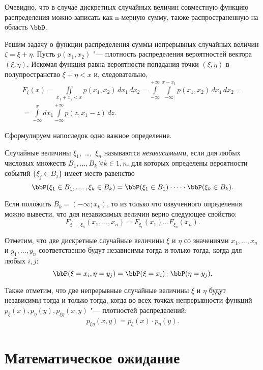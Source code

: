 Очевидно, что в случае дискретных случайных величин совместную функцию распределения можно записать как n-мерную сумму, также распространенную на область $\bbD$.


Решим задачу о функции распределения суммы непрерывных случайных величин $\zeta=\xi+\eta$. Пусть $p(x_1,x_2)$ "--- плотность распределения вероятностей вектора $(\xi,\eta)$. Искомая функция равна вероятности попадания точки $(\xi,\eta)$ в полупространство $\xi+\eta<x$ и, следовательно, 
\begin{multline}\label{ch31.1eq1}
F_{\zeta}(x)=\iint\limits_{x_1+x_2<x} p(x_1,x_2)\,dx_1\, dx_2=\int\limits_{-\infty}^{+\infty}\int\limits_{-\infty}^{x-x_1}p(x_1,x_2)\,dx_1\, dx_2=\\
=\int\limits_{-\infty}^{x}dx_1\int\limits_{-\infty}^{+\infty} p(z,x_1-z)\,dz.
\end{multline}

Сформулируем напоследок одно важное определение.
\begin{defn} Случайные величины $\xi_1$,~\dots,~$\xi_n$ называются \textit{независимыми}, если для любых числовых множеств $B_1,\dots, B_k\ \forall k\in\overline{1,n}$, для которых определены вероятности событий $\{\xi_j\in B_j\}$ имеет место равенство
$$
\bbP(\xi_1\in B_1,\dots, \xi_k \in B_k)=\bbP(\xi_1\in B_1)\cdot\dots\cdot \bbP(\xi_k \in B_k).
$$
\end{defn}

Если положить $B_k=(-\infty;x_k)$, то из только что озвученного определения можно вывести, что для независимых величин верно следующее свойство:
$$
F_{\xi_1,\dots\xi_n}(x_1,\dots,x_n)=F_{\xi_1}(x_1)\dots F_{\xi_n}(x_n).
$$

Отметим, что две дискретные случайные величины $\xi$ и $\eta$ со значениями $x_1,\dots,x_n$ и $y_1,\dots,y_n$ соответственно будут независимы тогда и только тогда, когда для любых $i,j$:
$$
\bbP(\xi = x_i, \eta = y_j) = \bbP (\xi = x_i)\cdot \bbP(\eta=y_j).
$$

Также отметим, что две непрерывные случайные величины $\xi$ и $\eta$ будут независимы тогда и только тогда, когда во всех точках непрерывности функций $p_\xi(x),p_\eta(y),p_{\xi\eta}(x,y)$ "--- плотностей распределений:
$$
p_{\xi\eta}(x,y)=p_\xi(x)\cdot p_\eta(y).
$$ 

\section{Математическое ожидание}

